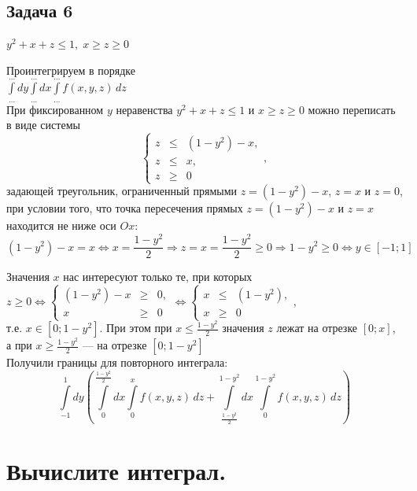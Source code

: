 \documentclass[a4paper, fleqn]{article}
\begin{document}
    
    \subsection*{Задача 6}
    
    $y^2 + x + z \le 1, \; x \ge z \ge 0$
    
    Проинтегрируем в порядке \\[3 pt]
    $\int\limits_{\dots}^{\dots} dy \int\limits_{\dots}^{\dots} dx \int\limits_{\dots}^{\dots} f(x, y, z)\, dz$ \\
    
    При фиксированном $y$ неравенства $y^2 + x + z \le 1$ и $x \ge z \ge 0$ можно переписать в виде системы
    \[ \left\{\begin{array}{rcl} z &\le& (1-y^2) - x, \\ z &\le& x, \\ z &\ge& 0 \end{array}\right., \]
    задающей треугольник, ограниченный прямыми $z = (1-y^2)-x$, $z = x$ и $z = 0$, при условии того, что точка пересечения прямых $z = (1-y^2)-x$ и $z = x$ находится не ниже оси $Ox$:
    \[ (1-y^2)-x = x \Leftrightarrow x = \frac{1-y^2}2 \Rightarrow z = x = \frac{1-y^2}2 \ge 0 \Rightarrow 1-y^2 \ge 0 \Leftrightarrow y \in [-1; 1] \]
    
    Значения $x$ нас интересуют только те, при которых $z \ge 0 \Leftrightarrow \left\{\begin{array}{rcl} (1-y^2)-x &\ge& 0, \\ x &\ge& 0 \end{array}\right. \Leftrightarrow \left\{\begin{array}{rcl} x &\le& (1-y^2), \\ x &\ge& 0 \end{array}\right.$, \\[3 pt]
    т.е. $x \in [0; 1-y^2]$. При этом при $x \le \frac{1-y^2}2$ значения $z$ лежат на отрезке $[0; x]$, а при $x \ge \frac{1-y^2}2$ --- на отрезке $[0; 1-y^2]$ \\
    
    Получили границы для повторного интеграла:
    \[ \int\limits_{-1}^{1} dy \left( \int\limits_{0}^{\frac{1-y^2}2} dx \int\limits_{0}^{x} f(x, y, z)\, dz + \int\limits_{\frac{1-y^2}2}^{1-y^2} dx \int\limits_{0}^{1-y^2} f(x, y, z)\, dz \right) \]
    
    \section*{Вычислите интеграл.}
\end{document}
